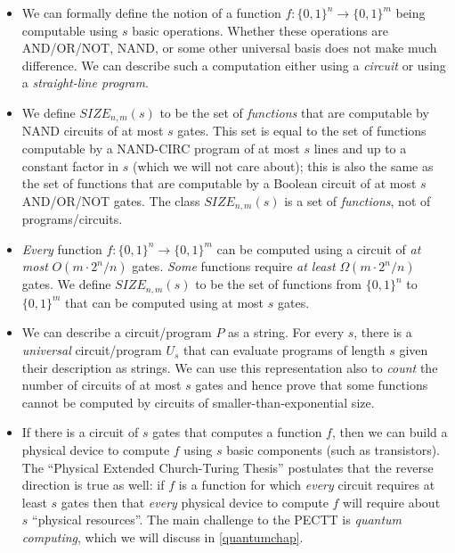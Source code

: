 \begin{itemize}
\item
  We can formally define the notion of a function
  \(f:\{0,1\}^n \rightarrow \{0,1\}^m\) being computable using \(s\)
  basic operations. Whether these operations are AND/OR/NOT, NAND, or
  some other universal basis does not make much difference. We can
  describe such a computation either using a \emph{circuit} or using a
  \emph{straight-line program}.
\item
  We define \(\ensuremath{\mathit{SIZE}}_{n,m}(s)\) to be the set of
  \emph{functions} that are computable by NAND circuits of at most \(s\)
  gates. This set is equal to the set of functions computable by a
  NAND-CIRC program of at most \(s\) lines and up to a constant factor
  in \(s\) (which we will not care about); this is also the same as the
  set of functions that are computable by a Boolean circuit of at most
  \(s\) AND/OR/NOT gates. The class
  \(\ensuremath{\mathit{SIZE}}_{n,m}(s)\) is a set of \emph{functions},
  not of programs/circuits.
\item
  \emph{Every} function \(f:\{0,1\}^n \rightarrow \{0,1\}^m\) can be
  computed using a circuit of \emph{at most} \(O(m \cdot 2^n / n)\)
  gates. \emph{Some} functions require \emph{at least}
  \(\Omega(m \cdot 2^n /n)\) gates. We define
  \(\ensuremath{\mathit{SIZE}}_{n,m}(s)\) to be the set of functions
  from \(\{0,1\}^n\) to \(\{0,1\}^m\) that can be computed using at most
  \(s\) gates.
\item
  We can describe a circuit/program \(P\) as a string. For every \(s\),
  there is a \emph{universal} circuit/program \(U_s\) that can evaluate
  programs of length \(s\) given their description as strings. We can
  use this representation also to \emph{count} the number of circuits of
  at most \(s\) gates and hence prove that some functions cannot be
  computed by circuits of smaller-than-exponential size.
\item
  If there is a circuit of \(s\) gates that computes a function \(f\),
  then we can build a physical device to compute \(f\) using \(s\) basic
  components (such as transistors). The ``Physical Extended
  Church-Turing Thesis'' postulates that the reverse direction is true
  as well: if \(f\) is a function for which \emph{every} circuit
  requires at least \(s\) gates then that \emph{every} physical device
  to compute \(f\) will require about \(s\) ``physical resources''. The
  main challenge to the PECTT is \emph{quantum computing}, which we will
  discuss in \cref{quantumchap}.
\end{itemize}

